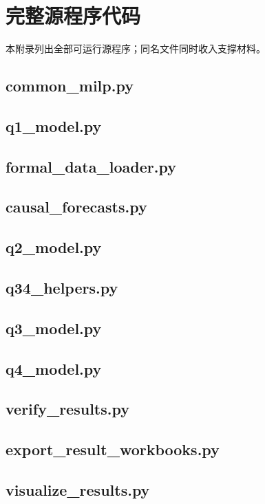 \documentclass[12pt,a4paper]{ctexart}
\begin{document}
\section{完整源程序代码}
本附录列出全部可运行源程序；同名文件同时收入支撑材料。
\subsection{common\_milp.py}

\subsection{q1\_model.py}

\subsection{formal\_data\_loader.py}

\subsection{causal\_forecasts.py}

\subsection{q2\_model.py}

\subsection{q34\_helpers.py}

\subsection{q3\_model.py}

\subsection{q4\_model.py}

\subsection{verify\_results.py}

\subsection{export\_result\_workbooks.py}

\subsection{visualize\_results.py}

\end{document}
